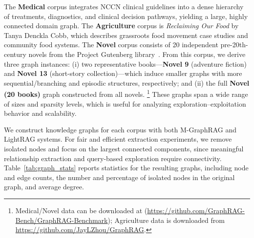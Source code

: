 The \textbf{Medical} corpus integrates NCCN clinical guidelines into a dense hierarchy of treatments, diagnostics, and clinical decision pathways, yielding a large, highly connected domain graph. The \textbf{Agriculture} corpus is \emph{Reclaiming Our Food} by Tanya Denckla Cobb, which describes grassroots food movement case studies and community food systems.
The \textbf{Novel} corpus consists of 20 independent pre-20th-century novels from the Project Gutenberg library~\cite{xiang2025use}. From this corpus, we derive three graph instances:
(i) two representative books---\textbf{Novel 9} (adventure fiction) and \textbf{Novel 13} (short-story collection)---which induce smaller graphs with more sequential/branching and episodic structures, respectively; and (ii) the full \textbf{Novel (20 books)} graph constructed from all novels.%
\footnote{
Medical/Novel data can be downloaded at (\url{https://github.com/GraphRAG-Bench/GraphRAG-Benchmark}); Agriculture data is downloaded from \url{https://github.com/JayLZhou/GraphRAG}.
}
These graphs span a wide range of sizes and sparsity levels, which is useful for analyzing exploration–exploitation behavior and scalability.

We construct knowledge graphs for each corpus with both M-GraphRAG and LightRAG systems. For fair and efficient extraction experiments, we remove isolated nodes and focus on the largest connected components, since meaningful relationship extraction and query-based exploration require connectivity. Table~\ref{tab:graph_stats} reports statistics for the resulting graphs, including node and edge counts, the number and percentage of isolated nodes in the original graph, and average degree.




